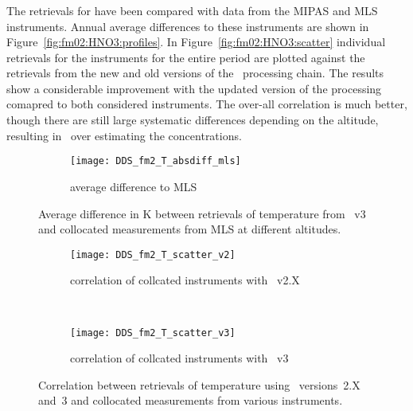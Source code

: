 \subsubsection{}
\label{sec:fm02:comparison:HNO3} The retrievals for  have been
compared with data from the MIPAS and MLS instruments. Annual average
differences to these instruments are shown in
Figure~\ref{fig:fm02:HNO3:profiles}. In Figure~\ref{fig:fm02:HNO3:scatter}
individual retrievals for the instruments for the entire period are plotted
against the retrievals from the new and old versions of the \smr\ processing
chain. The results show a considerable improvement with the updated version of
the processing comapred to both considered instruments. The over-all
correlation is much better, though there are still large systematic differences
depending on the altitude, resulting in \smr\ over estimating the
concentrations.



\begin{figure}[htpb]
    \centering
    \begin{subfigure}[b]{0.49\textwidth}
        \texttt{[image: DDS\_fm2\_T\_absdiff\_mls]}
        \caption{average difference to MLS}
        \label{fig:fm02:T:profiles:MLS}
    \end{subfigure}
    \caption{Average difference in K between retrievals of temperature from
    \smr~v3 and collocated measurements from MLS at different altitudes.}
    \label{fig:fm02:T:profiles}
\end{figure}

\begin{figure}[htpb]
    \centering
    \begin{subfigure}[b]{0.49\textwidth}
        \texttt{[image: DDS\_fm2\_T\_scatter\_v2]}
        \caption{correlation of collcated instruments with \smr~v2.X}
        \label{fig:fm02:T:scatter:v2}
    \end{subfigure}
    \,
    \begin{subfigure}[b]{0.49\textwidth}
        \texttt{[image: DDS\_fm2\_T\_scatter\_v3]}
        \caption{correlation of collcated instruments with \smr~v3}
        \label{fig:fm02:T:scatter:v3}
    \end{subfigure}
    \caption{Correlation between retrievals of temperature using \smr\
    versions~2.X and~3 and collocated measurements from various instruments.}
    \label{fig:fm02:T:scatter}
\end{figure}


